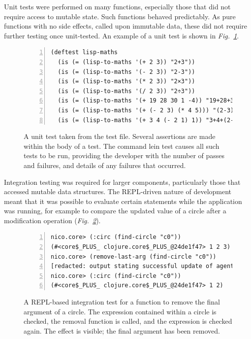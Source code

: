 \documentclass[12pt,twoside,notitlepage,xetex]{report}
\begin{document}
Unit tests were performed on many functions, especially those that did not require access to mutable state.  Such functions behaved predictably.  As pure functions with no side effects, called upon immutable data, these did not require further testing once unit-tested.  An example of a unit test is shown in \emph{Fig.~\ref{fig:LeinTest}}.

\begin{center}
\begin{figure}[H]
\begin{center}
\begin{minipage}{10.9cm}
\begin{Verbatim}[fontsize=\small,numbers=left]
(deftest lisp-maths
  (is (= (lisp-to-maths '(+ 2 3)) "2+3"))
  (is (= (lisp-to-maths '(- 2 3)) "2-3"))
  (is (= (lisp-to-maths '(* 2 3)) "2×3"))
  (is (= (lisp-to-maths '(/ 2 3)) "2÷3"))
  (is (= (lisp-to-maths '(+ 19 28 30 1 -4)) "19+28+30+1+-4"))
  (is (= (lisp-to-maths '(+ (- 2 3) (* 4 5))) "(2-3)+(4×5)"))
  (is (= (lisp-to-maths '(+ 3 4 (- 2 1) 1)) "3+4+(2-1)+1")))
\end{Verbatim}
\end{minipage}
\end{center}
\caption{A unit test taken from the test file.  Several assertions are made within the body of a test.  The command {\ttfamily lein test} causes all such tests to be run, providing the developer with the number of passes and failures, and details of any failures that occurred.}
\label{fig:LeinTest}
\end{figure}
\end{center}

Integration testing was required for larger components, particularly those that accessed mutable data structures.  The REPL-driven nature of development meant that it was possible to evaluate certain statements while the application was running, for example to compare the updated value of a circle after a modification operation (\emph{Fig.~\ref{fig:ReplTest}}).

\begin{center}
\begin{figure}[H]
\begin{center}
\begin{minipage}{9.5cm}
\begin{Verbatim}[fontsize=\small,numbers=left]
nico.core> (:circ (find-circle "c0"))
(#<core$_PLUS_ clojure.core$_PLUS_@24de1f47> 1 2 3)
nico.core> (remove-last-arg (find-circle "c0"))
[redacted: output stating successful update of agent]
nico.core> (:circ (find-circle "c0"))
(#<core$_PLUS_ clojure.core$_PLUS_@24de1f47> 1 2)
\end{Verbatim}
\end{minipage}
\end{center}
\caption{A REPL-based integration test for a function to remove the final argument of a circle.  The expression contained within a circle is checked, the removal function is called, and the expression is checked again.  The effect is visible; the final argument has been removed.}
\label{fig:ReplTest}
\end{figure}
\end{center}
\end{document}
